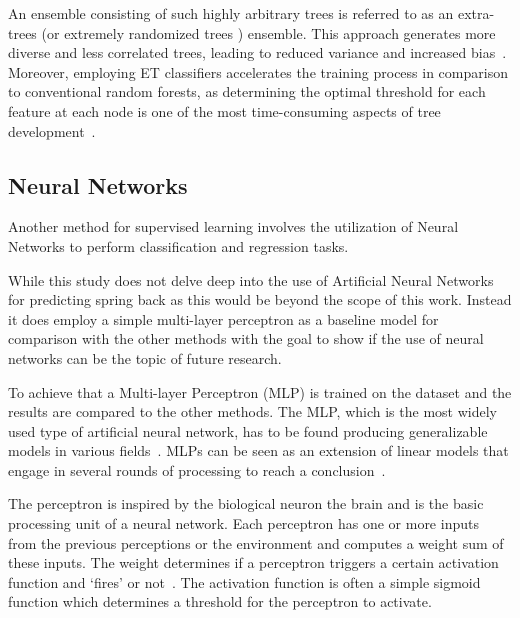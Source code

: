 An ensemble consisting of such highly arbitrary trees is referred to as an extra-trees (or extremely randomized trees
) ensemble.
This approach generates more diverse and less correlated trees, leading to reduced variance and increased
bias~\cite[p. 351]{geron2022hands}.
Moreover, employing \ac{ET} classifiers accelerates the training process in
comparison to conventional random forests, as determining the optimal threshold for each feature at each node is one
of the most time-consuming aspects of tree development~\cite[p. 351]{geron2022hands}.

\subsection{Neural Networks}\label{subsec:neural-networks}
Another method for supervised learning involves the utilization of Neural Networks to
perform classification and regression tasks.

While this study does not delve deep into the use of Artificial Neural Networks for predicting spring
back as this would be beyond the scope of this work.
Instead it does employ a simple multi-layer perceptron as a baseline model for comparison with the other
methods with the goal to show if the use of neural networks can be the topic of future research.

To achieve that a Multi-layer Perceptron (MLP) is trained on the dataset and the results are compared to the other
methods.
The MLP, which is the most widely used type of artificial neural network, has to be found
producing generalizable models in various fields~\cite[p.451]{taud2018multilayer}.
MLPs can be seen as an extension of linear models that engage in several rounds of processing to
reach a conclusion~\cite[p. 104]{muller_introductionmachinelearning_2016}.

The perceptron is inspired by the biological neuron the brain and is the basic processing unit of a neural
network.
Each perceptron has one or more inputs from the previous perceptions or the environment and computes a weight sum of
these inputs.
The weight determines if a perceptron triggers a certain activation function and `fires' or
not~\cite[pp. 271--273]{alpaydin2020introduction}.
The activation function is often a simple sigmoid function which determines a threshold for the perceptron to activate.

